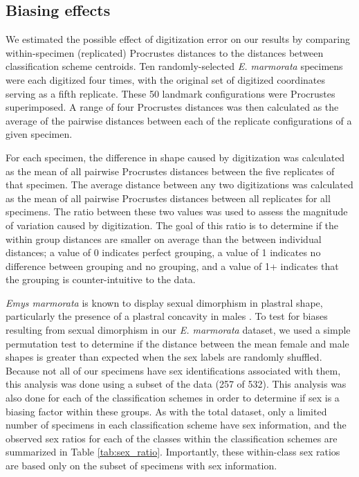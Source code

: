 \documentclass[10pt,letterpaper]{article}
\begin{document}
\subsection*{Biasing effects}
We estimated the possible effect of digitization error \cite{Arnqvist1998,Cramon2007,Munoz-MunozF.2010} on our results by comparing within-specimen (replicated) Procrustes distances to the distances between classification scheme centroids. Ten randomly-selected \textit{E. marmorata} specimens were each digitized four times, with the original set of digitized coordinates serving as a fifth replicate. These 50 landmark configurations were Procrustes superimposed. A range of four Procrustes distances was then calculated as the average of the pairwise distances between each of the replicate configurations of a given specimen.

For each specimen, the difference in shape caused by digitization was calculated as the mean of all pairwise Procrustes distances between the five replicates of that specimen. The average distance between any two digitizations was calculated as the mean of all pairwise Procrustes distances between all replicates for all specimens. The ratio between these two values was used to assess the magnitude of variation caused by digitization. The goal of this ratio is to determine if the within group distances are smaller on average than the between individual distances; a value of 0 indicates perfect grouping, a value of 1 indicates no difference between grouping and no grouping, and a value of 1+ indicates that the grouping is counter-intuitive to the data.

\textit{Emys marmorata} is known to display sexual dimorphism in plastral shape, particularly the presence of a plastral concavity in males \cite{Seeliger1945}. To test for biases resulting from sexual dimorphism in our \textit{E. marmorata} dataset, we used a simple permutation test to determine if the distance between the mean female and male shapes is greater than expected when the sex labels are randomly shuffled. Because not all of our specimens have sex identifications associated with them, this analysis was done using a subset of the data (257 of 532). This analysis was also done for each of the classification schemes in order to determine if sex is a biasing factor within these groups. As with the total dataset, only a limited number of specimens in each classification scheme have sex information, and the observed sex ratios for each of the classes within the classification schemes are summarized in Table \ref{tab:sex_ratio}. Importantly, these within-class sex ratios are based only on the subset of specimens with sex information.
\end{document}
